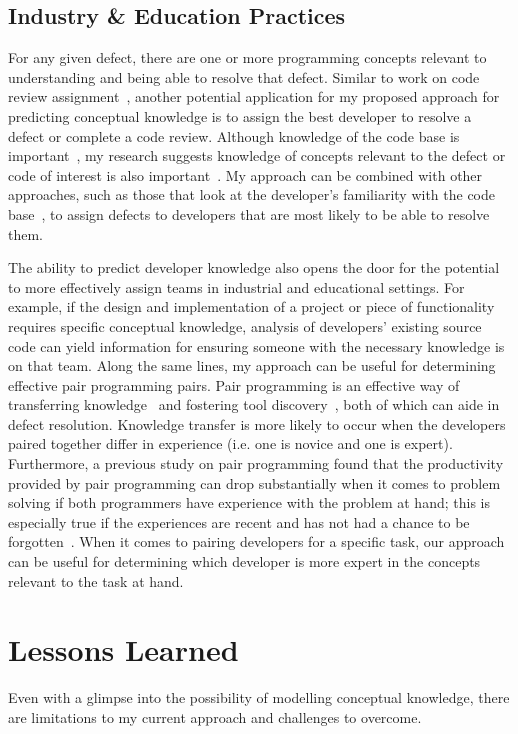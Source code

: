 \subsection{Industry \& Education Practices}

For any given defect, there are one or more programming concepts relevant to understanding and being able to resolve that defect. Similar to work on code review assignment~\cite{balachandran2013reducing}, another potential application for my proposed approach for predicting conceptual knowledge is to assign the best developer to resolve a defect or complete a code review. Although knowledge of the code base is important~\cite{fritz2010degree}, my research suggests knowledge of concepts relevant to the defect or code of interest is also important~\cite{johnson2016cross}. My approach can be combined with other approaches, such as those that look at the developer's familiarity with the code base~\cite{fritz2010degree}, to assign defects to developers that are most likely to be able to resolve them. 	

The ability to predict developer knowledge also opens the door for the potential to more effectively assign  teams in industrial and educational settings. For example, if the design and implementation of a project or piece of functionality requires specific conceptual knowledge, analysis of developers' existing source code can yield information for ensuring someone with the necessary knowledge is on that team.
Along the same lines, my approach can be useful for determining effective pair programming pairs. 
Pair programming is an effective way of transferring knowledge~\cite{plonka2015knowledge} and fostering tool discovery~\cite{murphy2011peer}, both of which can aide in defect resolution. Knowledge transfer is more likely to occur when the developers paired together differ in experience (i.e. one is novice and one is expert). Furthermore, a previous study on pair programming found that the productivity provided by pair programming can drop substantially when it comes to problem solving if both programmers have experience with the problem at hand; this is especially true if the experiences are recent and has not had a chance to be forgotten~\cite{lui2006pair}. When it comes to pairing developers for a specific task, our approach can be useful for determining which developer is more expert in the concepts relevant to the task at hand. 

\section{Lessons Learned}\label{sec:challenges}
Even with a glimpse into the possibility of modelling conceptual knowledge, there are limitations to my current approach and challenges to overcome.

